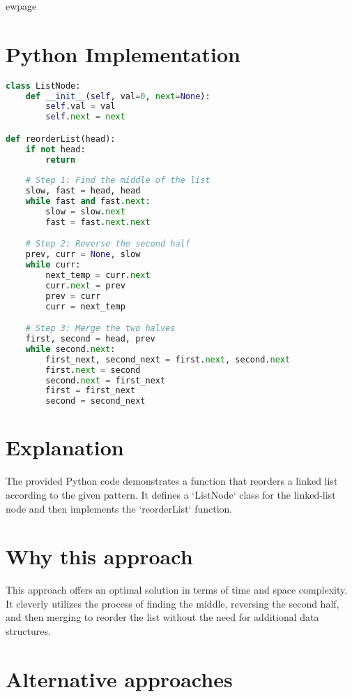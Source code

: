 ewpage
\section*{Python Implementation}

\begin{fullwidth}
\begin{lstlisting}[language=Python]
class ListNode:
    def __init__(self, val=0, next=None):
        self.val = val
        self.next = next

def reorderList(head):
    if not head:
        return
    
    # Step 1: Find the middle of the list
    slow, fast = head, head
    while fast and fast.next:
        slow = slow.next
        fast = fast.next.next

    # Step 2: Reverse the second half
    prev, curr = None, slow
    while curr:
        next_temp = curr.next
        curr.next = prev
        prev = curr
        curr = next_temp

    # Step 3: Merge the two halves
    first, second = head, prev
    while second.next:
        first_next, second_next = first.next, second.next
        first.next = second
        second.next = first_next
        first = first_next
        second = second_next
\end{lstlisting}

\end{fullwidth}

\section*{Explanation}

The provided Python code demonstrates a function that reorders a linked list according to the given pattern. It defines a `ListNode` class for the linked-list node and then implements the `reorderList` function.

\section*{Why this approach}

This approach offers an optimal solution in terms of time and space complexity. It cleverly utilizes the process of finding the middle, reversing the second half, and then merging to reorder the list without the need for additional data structures.

\section*{Alternative approaches}

